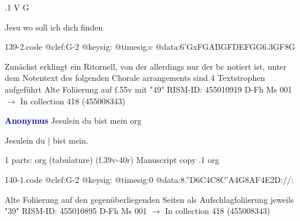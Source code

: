 \documentclass[twocolumn]{book}
\begin{document}
.1  V  G
\newline \begin{footnotesize} Jesu wo soll ich dich finden \end{footnotesize}  
\begin{filecontents*}{139-2.code}
@clef:G-2
@keysig:
@timesig:c
@data:{6'GxFGA}{BGFD}{EFGG}{6.3GF}8G
\end{filecontents*}
\newline
%

\newline Zunächst erklingt ein Ritornell, von der allerdings nur der bc notiert ist, unter dem Notentext des folgenden Chorale arrangements sind 4 Textstrophen aufgeführt
\newline Alte Foliierung auf f.55v mit "49"
\newline RISM-ID: 455010919
\newline D-Fh  Ms 001
\newline $\rightarrow$ In collection 418 (455008343)
      
\newline \par \vspace{7pt} \textcolor{darkblue}{\textbf{Anonymus  }}
\newline Jesulein du bist mein
\newline org
\newline \begin{itshape}[f.39v, at left:] Jesulein du | bist mein.\end{itshape} 
\newline \textcolor{darkblue}{}  1 parts: org (tabulature)  (f.39v-40r)
\newline Manuscript copy
.1  org  
\begin{filecontents*}{140-1.code}
@clef:G-2
@keysig:
@timesig:0
@data:8.''D6C4C{8C'A}4G{8AF}4E2D://:
\end{filecontents*}
\newline
%

\newline Alte Foliierung auf den gegenüberliegenden Seiten als Aufschlagfoliierung jeweils "39"
\newline RISM-ID: 455010895
\newline D-Fh  Ms 001
\newline $\rightarrow$ In collection 418 (455008343)
      
\end{document}

